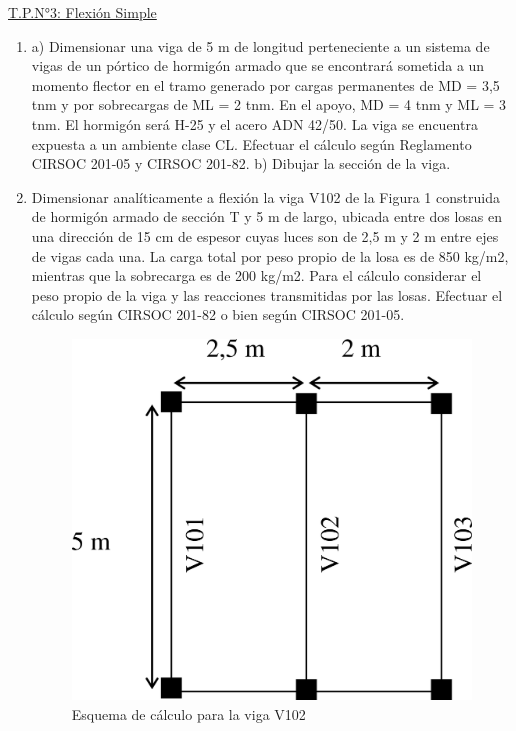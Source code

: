 \begin{center}
\underline{\Large{T.P.N°3: Flexión Simple}}
\end{center}

\begin{enumerate}
\item a) Dimensionar una viga de 5 m de longitud perteneciente a un sistema de vigas de un pórtico de hormigón armado que se encontrará sometida a un momento flector en el tramo generado por cargas permanentes de MD = 3,5 tnm y por sobrecargas de ML = 2 tnm. En el apoyo, MD = 4 tnm y ML = 3 tnm. El hormigón será H-25 y el acero ADN 42/50. La viga se encuentra expuesta a un ambiente clase CL. Efectuar el cálculo según Reglamento CIRSOC 201-05 y CIRSOC 201-82.
b) Dibujar la sección de la viga.
\item Dimensionar analíticamente a flexión la viga V102 de la Figura 1 construida de hormigón armado de sección T y 5 m de largo, ubicada entre dos losas en una dirección de 15 cm de espesor cuyas luces son de 2,5 m y 2 m entre ejes de vigas cada una. La carga total por peso propio de la losa es de 850 kg/m2, mientras que la sobrecarga es de 200 kg/m2. Para el cálculo considerar el peso propio de la viga y las reacciones transmitidas por las losas.
Efectuar el cálculo según CIRSOC 201-82 o bien según CIRSOC 201-05.
\begin{figure}[H]
\begin{center}
     \includegraphics[scale = 0.9]{chapters/chapter_1/images/figura1.png}
\caption{Esquema de cálculo para la viga V102}
\end{center}
\end{figure}


\end{enumerate}
